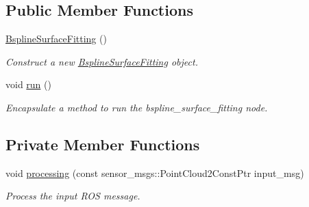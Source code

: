\subsection*{Public Member Functions}
\begin{DoxyCompactItemize}
\item 
\hyperlink{classbspline__surface__fitting__node_1_1_bspline_surface_fitting_a0c6104db4570cd4a865e85d03fae26c3}{Bspline\+Surface\+Fitting} ()
\begin{DoxyCompactList}\small\item\em Construct a new \hyperlink{classbspline__surface__fitting__node_1_1_bspline_surface_fitting}{Bspline\+Surface\+Fitting} object. \end{DoxyCompactList}\item 
void \hyperlink{classbspline__surface__fitting__node_1_1_bspline_surface_fitting_a3ca4a5eb83d40636830e337cac288d03}{run} ()
\begin{DoxyCompactList}\small\item\em Encapsulate a method to run the bspline\+\_\+surface\+\_\+fitting node. \end{DoxyCompactList}\end{DoxyCompactItemize}
\subsection*{Private Member Functions}
\begin{DoxyCompactItemize}
\item 
void \hyperlink{classbspline__surface__fitting__node_1_1_bspline_surface_fitting_a588e2e4f382fc5198b4c17613cf7f03a}{processing} (const sensor\+\_\+msgs\+::\+Point\+Cloud2\+Const\+Ptr input\+\_\+msg)
\begin{DoxyCompactList}\small\item\em Process the input R\+OS message. \end{DoxyCompactList}\end{DoxyCompactItemize}
